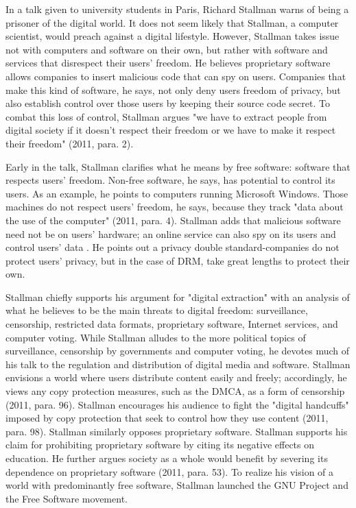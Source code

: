 In a talk given to university students in Paris, Richard Stallman warns of
being a prisoner of the digital world. It does not seem likely that Stallman, a
computer scientist, would preach against a digital lifestyle.  However,
Stallman takes issue not with computers and software on their own, but rather
with software and services that disrespect their users' freedom.  He believes
proprietary software allows companies to insert malicious code that can spy on
users. Companies that make this kind of software, he says, not only deny users
freedom of privacy, but also establish control over those users by keeping
their source code secret. To combat this loss of control, Stallman argues "we
have to extract people from digital society if it doesn't respect their freedom
or we have to make it respect their freedom" (2011, para. 2).

Early in the talk, Stallman clarifies what he means by free software: software
that respects users' freedom. Non-free software, he says, has potential to
control its users. As an example, he points to computers running Microsoft
Windows. Those machines do not respect users' freedom, he says, because they
track "data about the use of the computer" (2011, para.  4). Stallman adds that
malicious software need not be on users' hardware; an online service can also
spy on its users and control users' data . He points out a privacy double
standard-companies do not protect users' privacy, but in the case of DRM, take
great lengths to protect their own.

Stallman chiefly supports his argument for "digital extraction" with an
analysis of what he believes to be the main threats to digital freedom:
surveillance, censorship, restricted data formats, proprietary software,
Internet services, and computer voting. While Stallman alludes to the more
political topics of surveillance, censorship by governments and computer
voting, he devotes much of his talk to the regulation and distribution of
digital media and software.  Stallman envisions a world where users distribute
content easily and freely; accordingly, he views any copy protection measures,
such as the DMCA, as a form of censorship (2011, para.  96). Stallman
encourages his audience to fight the "digital handcuffs" imposed by copy
protection that seek to control how they use content (2011, para. 98).
Stallman similarly opposes proprietary software. Stallman supports his claim
for prohibiting proprietary software by citing its negative effects on
education. He further argues society as a whole would benefit by severing
its dependence on proprietary software (2011, para.  53). To realize his
vision of a world with predominantly free software, Stallman launched the
GNU Project and the Free Software movement.

